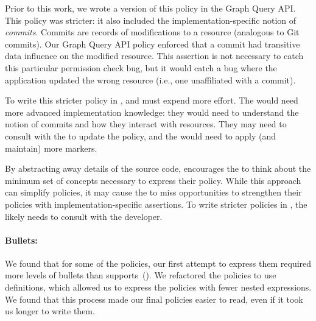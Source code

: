 Prior to this work, we wrote a version of this policy in the Graph Query API.
%
This policy was stricter: it also included the implementation-specific notion of \emph{commits}.
%
Commits are records of modifications to a resource (analogous to Git commits).
%
Our Graph Query API policy enforced that a commit had transitive data influence on the modified resource.
%
This assertion is not necessary to catch this particular permission check bug, 
but it would catch a bug where the application updated the wrong resource (i.e., one unaffiliated with a commit).

To write this stricter policy in \syslang{}, \ces{} and \devs{} must expend more effort.
%
The \ce{} would need more advanced implementation knowledge: 
they would need to understand the notion of commits and how they interact with resources.
%
They may need to consult with the \dev{} to update the policy,
and the \dev{} would need to apply (and maintain) more markers.

By abstracting away details of the source code,
\syslang{} encourages the \ce{} to think about the minimum set of concepts
necessary to express their policy.
%
While this approach can simplify policies,
it may cause the \ce{} to miss opportunities to strengthen their policies with implementation-specific assertions.
%
%
To write stricter policies in \syslang, the \ce{} likely needs to consult with the developer.

\paragraph{Bullets:} We found that for some of the policies, 
our first attempt to express them required more levels of bullets than \sys{} supports~().
%
We refactored the policies to use definitions, 
which allowed us to express the policies with fewer nested expressions.
%
We found that this process made our final policies easier to read,
even if it took us longer to write them.